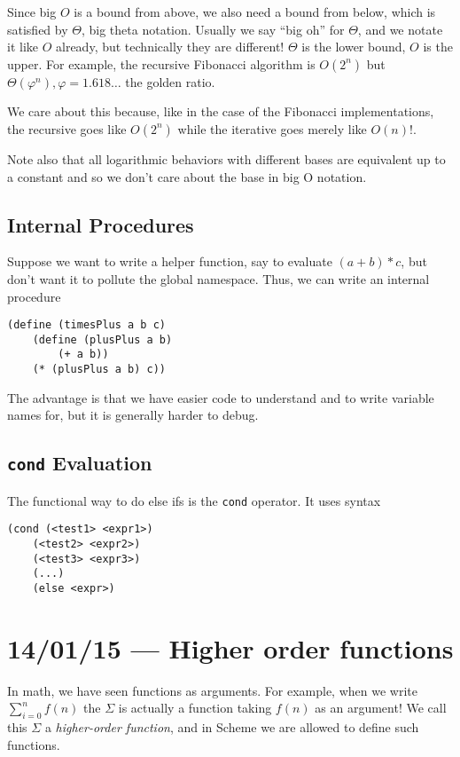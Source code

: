 \documentclass[10pt]{report}
\begin{document}
Since big $O$ is a bound from above, we also need a bound from below, which is satisfied by $\Theta$, big theta notation. Usually we say ``big oh'' for $\Theta$, and we notate it like $O$ already, but technically they are different! $\Theta$ is the lower bound, $O$ is the upper. For example, the recursive Fibonacci algorithm is $O(2^n)$ but $\Theta(\varphi^n), \varphi = 1.618\dots$ the golden ratio.

We care about this because, like in the case of the Fibonacci implementations, the recursive goes like $O(2^n)$ while the iterative goes merely like $O(n)$!.

Note also that all logarithmic behaviors with different bases are equivalent up to a constant and so we don't care about the base in big O notation. 

\section{Internal Procedures}

Suppose we want to write a helper function, say to evaluate $(a + b) * c$, but don't want it to pollute the global namespace. Thus, we can write an internal procedure
\begin{verbatim}
(define (timesPlus a b c)
    (define (plusPlus a b)
        (+ a b))
    (* (plusPlus a b) c))
\end{verbatim}

The advantage is that we have easier code to understand and to write variable names for, but it is generally harder to debug.

\section{\texttt{cond} Evaluation}

The functional way to do else ifs is the \texttt{cond} operator. It uses syntax
\begin{verbatim}
(cond (<test1> <expr1>)
    (<test2> <expr2>)
    (<test3> <expr3>)
    (...)
    (else <expr>)
\end{verbatim}

\chapter{14/01/15 --- Higher order functions}

In math, we have seen functions as arguments. For example, when we write $\sum\limits_{i=0}^{n}f(n)$ the $\Sigma$ is actually a function taking $f(n)$ as an argument! We call this $\Sigma$ a \emph{higher-order function}, and in Scheme we are allowed to define such functions.
\end{document}
